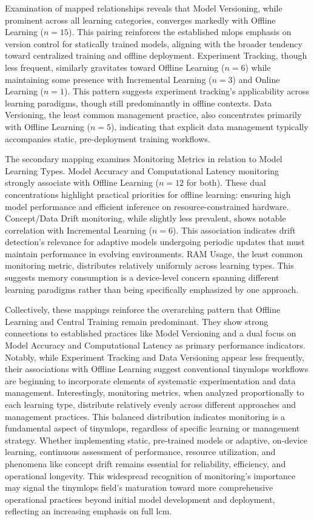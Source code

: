 Examination of mapped relationships reveals that Model Versioning, while prominent across all learning categories, converges markedly with Offline Learning ($n=15$). This pairing reinforces the established \gls{mlops} emphasis on version control for statically trained models, aligning with the broader tendency toward centralized training and offline deployment.
Experiment Tracking, though less frequent, similarly gravitates toward Offline Learning ($n=6$) while maintaining some presence with Incremental Learning ($n=3$) and Online Learning ($n=1$). This pattern suggests experiment tracking's applicability across learning paradigms, though still predominantly in offline contexts.
Data Versioning, the least common management practice, also concentrates primarily with Offline Learning ($n=5$), indicating that explicit data management typically accompanies static, pre-deployment training workflows.

The secondary mapping examines Monitoring Metrics in relation to Model Learning Types. Model Accuracy and Computational Latency monitoring strongly associate with Offline Learning ($n=12$ for both). These dual concentrations highlight practical priorities for offline learning: ensuring high model performance and efficient inference on resource-constrained hardware.
Concept/Data Drift monitoring, while slightly less prevalent, shows notable correlation with Incremental Learning ($n=6$). This association indicates drift detection's relevance for adaptive models undergoing periodic updates that must maintain performance in evolving environments.
RAM Usage, the least common monitoring metric, distributes relatively uniformly across learning types. This suggests memory consumption is a device-level concern spanning different learning paradigms rather than being specifically emphasized by one approach.

Collectively, these mappings reinforce the overarching pattern that Offline Learning and Central Training remain predominant. They show strong connections to established practices like Model Versioning and a dual focus on Model Accuracy and Computational Latency as primary performance indicators.
Notably, while Experiment Tracking and Data Versioning appear less frequently, their associations with Offline Learning suggest conventional \gls{tinymlops} workflows are beginning to incorporate elements of systematic experimentation and data management. Interestingly, monitoring metrics, when analyzed proportionally to each learning type, distribute relatively evenly across different approaches and management practices. This balanced distribution indicates monitoring is a fundamental aspect of \gls{tinymlops}, regardless of specific learning or management strategy. Whether implementing static, pre-trained models or adaptive, on-device learning, continuous assessment of performance, resource utilization, and phenomena like concept drift remains essential for reliability, efficiency, and operational longevity. This widespread recognition of monitoring's importance may signal the \gls{tinymlops} field's maturation toward more comprehensive operational practices beyond initial model development and deployment, reflecting an increasing emphasis on full \gls{lcm}.

